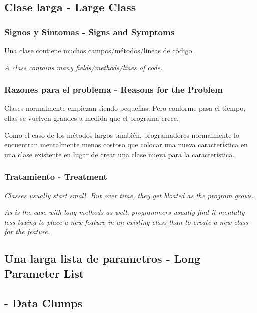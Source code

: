\documentclass[11pt,a4paper,oneside]{book}
\begin{document}
\subsection{Clase larga -   Large Class}
\subsubsection{Signos y Sintomas - Signs and Symptoms}

Una clase contiene muchos campos/métodos/lineas de código.

\textit{A class contains many fields/methods/lines of code.}


    
\subsubsection{Razones para el problema - Reasons for the Problem}

Clases normalmente empiezan siendo pequeñas. Pero conforme pasa el tiempo, ellas se vuelven grandes a medida que el programa crece.

Como el caso de los métodos largos también, programadores normalmente lo encuentran mentalmente menos costoso que colocar una nueva característica en una clase existente en lugar de crear una clase nueva para la característica. 

\subsubsection{Tratamiento - Treatment}




\textit{Classes usually start small. But over time, they get bloated as the program grows.}

\textit{As is the case with long methods as well, programmers usually find it mentally less taxing to place a new feature in an existing class than to create a new class for the feature.}



\subsection{Una larga lista de parametros -   Long Parameter List}

\subsection{ -   Data Clumps}
\end{document}
